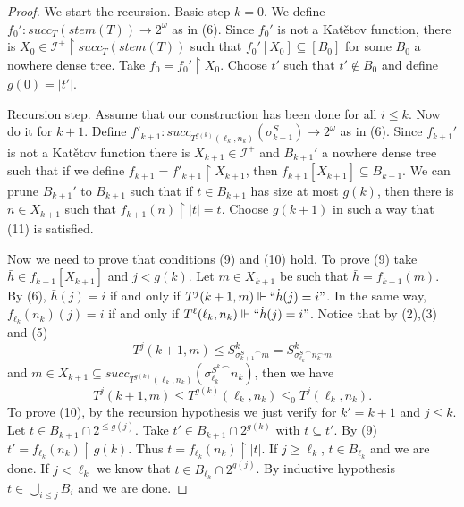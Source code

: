 \documentclass{amsart}
\theoremstyle{definition}
\theoremstyle{remark}
\numberwithin{equation}{section}
\newcommand{\id}{\mathcal{I}}
\begin{document}
\begin{proof}

We start the recursion. Basic step $k=0$. We define $f_0':succ_T(stem(T))\rightarrow2^\omega$ as in (6).
Since $f_0'$ is not a Kat\v{e}tov function, there is $X_0\in \id^+\upharpoonright succ_T(stem(T))$ such that $f_0'[X_0]\subseteq [B_0]$ for some $B_0$ a nowhere dense tree. Take $f_0=f_0'\upharpoonright X_0$. Choose $t'$ such that $t'\not \in B_0$ and define $g(0)=|t'|$.

Recursion step. Assume that our construction has been done for all $i\leq k$. Now do it for $k+1$. Define $f'_{k+1}:succ_{T^{g(k)}(\ell_k,n_k)}(\sigma^S_{k+1}) \rightarrow2^\omega$ as in (6). Since $f_{k+1}'$ is not a Kat\v{e}tov function there is $X_{k+1}\in \id^+$ and $B_{k+1}'$ a nowhere dense tree such that if we define $f_{k+1}=f'_{k+1}\upharpoonright X_{k+1}$, then $f_{k+1}[X_{k+1}]\subseteq B_{k+1}$. We can prune $B_{k+1}'$ to $B_{k+1}$ such that if $t\in B_{k+1}$ has size at most $g(k)$, then there is $n\in X_{k+1}$ such that $f_{k+1}(n)\upharpoonright |t|= t$. Choose $g(k+1)$ in such a way that (11) is satisfied.

Now we need to prove that conditions (9) and (10) hold. To prove (9) take $\bar h\in f_{k+1}[X_{k+1}]$ and $j<g(k)$. Let $m\in X_{k+1}$ be such that $\bar h=f_{k+1}(m)$. By (6), $\bar h(j)=i$ if and only if $T^j(k+1,m)\Vdash``\dot h(j)=i"$. In the same way, $f_{\ell_k}(n_k)(j)=i$ if and only if $T^\ell(\ell_k,n_k)\Vdash``\dot h(j)=i"$.
Notice that by (2),(3) and (5)
\[T^j(k+1,m)\leq S^{k}_{{\sigma^S_{k+1}}^\frown m}=S^{k}_{{\sigma^S_{\ell_k}}^\frown n_k^\frown m}
\]
and  $m\in X_{k+1}\subseteq succ_{T^{g(k)}(\ell_k,n_k)}({\sigma^{S^k}_{\ell_k}}^\frown n_k)$, then we have 
\begin{displaymath}
    T^j(k+1,m)\leq T^{g(k)}(\ell_k,n_k)\leq_0 T^j(\ell_k,n_k).
\end{displaymath}
To prove (10), by the recursion hypothesis we just verify for $k'=k+1$ and $j\leq k$. Let $t\in B_{k+1}\cap2^{\leq g(j)}$. Take $t'\in B_{k+1}\cap2^{g(k)}$ with $t \subseteq t'$. By (9) $t'=f_{\ell_k}(n_k)\upharpoonright g(k)$. Thus $t=f_{\ell_k}(n_k)\upharpoonright |t|$. If $j\geq \ell_k$, $t\in B_{\ell_k}$ and we are done. If $j<\ell_k$ we know that $t\in B_{\ell_k}\cap 2^{g(j)}$. By inductive hypothesis $t\in \bigcup_{i\leq j} B_i$ and we are done.




\end{proof}
\end{document}

